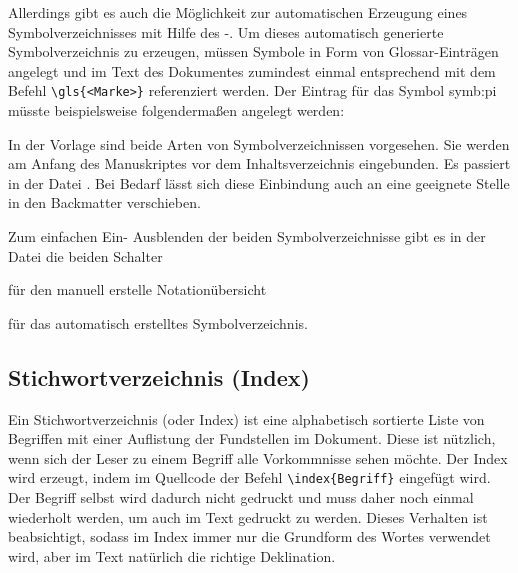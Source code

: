 Allerdings gibt es auch die Möglichkeit zur automatischen Erzeugung eines
Symbolverzeichnisses mit Hilfe des -.
Um dieses automatisch generierte Symbolverzeichnis zu erzeugen,
müssen Symbole in Form von Glossar-Einträgen angelegt und im Text des Dokumentes
zumindest einmal entsprechend mit dem Befehl \lstinline|\gls{<Marke>}| referenziert werden.
Der Eintrag für das Symbol \gls{symb:pi} müsste beispielsweise folgendermaßen angelegt werden:
\begingroup%
\setlength{\topskip}{0pt}%
\begin{latex}[caption={Definition eines Symboleintrages},label={lst:SymbEntry}]
\end{latex}
\endgroup%

In der Vorlage sind beide Arten von Symbolverzeichnissen vorgesehen.
Sie werden am Anfang des Manuskriptes vor dem Inhaltsverzeichnis eingebunden.
Es passiert in der Datei .
Bei Bedarf lässt sich diese Einbindung auch an eine geeignete Stelle in den Backmatter verschieben.

Zum einfachen Ein- \bzw Ausblenden der beiden Symbolverzeichnisse
gibt es in der Datei 
die beiden Schalter
\begin{itemize*}
\item {} für den manuell erstelle Notationübersicht
\item {} für das automatisch erstelltes Symbolverzeichnis.
\end{itemize*}



\subsection*{Stichwortverzeichnis (Index)}%
%
%
\label{sec:Index}
%
Ein Stichwortverzeichnis (oder Index)
ist eine alphabetisch sortierte Liste von Begriffen mit einer Auflistung der Fundstellen im Dokument.
Diese ist nützlich, wenn sich der Leser zu einem Begriff alle Vorkommnisse sehen möchte.
Der Index wird erzeugt, indem im Quellcode der Befehl \lstinline+\index{Begriff}+
eingefügt wird. Der Begriff selbst wird dadurch nicht gedruckt und muss daher
noch einmal wiederholt werden, um auch im Text gedruckt zu werden. Dieses Verhalten
ist beabsichtigt, sodass im Index immer nur die Grundform des Wortes verwendet
wird, aber im Text natürlich die richtige Deklination.
